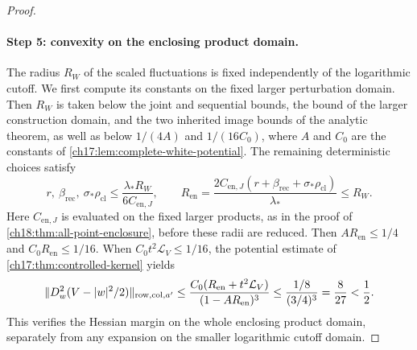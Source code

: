 \begin{proof}
\paragraph{Step 5: convexity on the enclosing product domain.}
The radius $R_W$ of the scaled fluctuations is fixed independently of the logarithmic cutoff. We first compute its constants on the fixed larger perturbation domain. Then $R_W$ is taken below the joint and sequential bounds, the bound of the larger construction domain, and the two inherited image bounds of the analytic theorem, as well as below $1/(4A)$ and $1/(16C_0)$, where $A$ and $C_0$ are the constants of \cref{ch17:lem:complete-white-potential}. The remaining deterministic choices satisfy
\begin{equation}\label{ch18:eq:ambient-physical-gates}
 r,\ \beta_{\mathrm{rec}},\ \sigma_*\rho_{\mathrm{cl}}
 \le\frac{\lambda_*R_W}{6C_{\mathrm{en},J}},\qquad
 R_{\mathrm{en}}=
 \frac{2C_{\mathrm{en},J}
  (r+\beta_{\mathrm{rec}}+\sigma_*\rho_{\mathrm{cl}})}{\lambda_*}
 \le R_W.
\end{equation}
Here $C_{\mathrm{en},J}$ is evaluated on the fixed larger products, as in the proof of \cref{ch18:thm:all-point-enclosure}, before these radii are reduced. Then $AR_{\mathrm{en}}\le1/4$ and $C_0R_{\mathrm{en}}\le1/16$. When $C_0t^2\mathcal L_V\le1/16$, the potential estimate of \cref{ch17:thm:controlled-kernel} yields
\[
 \lVert D_w^2(V-\lvert w\rvert^2/2)\rVert_{\mathrm{row,col},a'}
 \le\frac{C_0(R_{\mathrm{en}}+t^2\mathcal L_V)}
                 {(1-AR_{\mathrm{en}})^3}
 \le\frac{1/8}{(3/4)^3}=\frac8{27}<\frac12.
\]
This verifies the Hessian margin on the whole enclosing product domain, separately from any expansion on the smaller logarithmic cutoff domain.


\end{proof}
